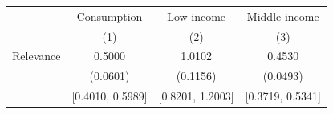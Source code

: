 \begin{threeparttable}
\begin{tabular}{l | ccc}
\toprule
& \multicolumn{1}{c}{Consumption} & \multicolumn{1}{c}{Low income} & \multicolumn{1}{c}{Middle income} \\
& (1) & (2) & (3) \\
\midrule
  Relevance & 0.5000 & 1.0102 & 0.4530 \\
           & (0.0601) & (0.1156) & (0.0493) \\
           & [0.4010, 0.5989] & [0.8201, 1.2003] & [0.3719, 0.5341] \\
\bottomrule
\end{tabular}
\end{threeparttable}
